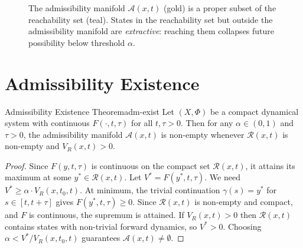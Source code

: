 \documentclass[12pt,twoside,openright]{book}
\newcommand{\reach}{\mathcal{R}}
\newcommand{\adm}{\mathcal{A}}
\begin{document}
\begin{figure}[h]
\centering
{}
\caption{The admissibility manifold $\adm(x,t)$ (gold) is a
  proper subset of the reachability set (teal). States in
  the reachability set but outside the admissibility
  manifold are \emph{extractive}: reaching them collapses
  future possibility below threshold $\alpha$.}
\label{fig:adm-manifold}
\end{figure}

\section{Admissibility Existence}
\label{sec:ch14-existence}

\begin{theorem}{Admissibility Existence Theorem}{adm-exist}
  Let $(X,\Phi)$ be a compact dynamical system with
  continuous $F(\cdot,t,\tau)$ for all $t,\tau>0$. Then for
  any $\alpha\in(0,1)$ and $\tau>0$, the admissibility
  manifold $\adm(x,t)$ is non-empty whenever $\reach(x,t)$
  is non-empty and $V_R(x,t)>0$.
\end{theorem}

\begin{proof}
  Since $F(y,t,\tau)$ is continuous on the compact set
  $\reach(x,t)$, it attains its maximum at some
  $y^*\in\reach(x,t)$. Let $V^* = F(y^*,t,\tau)$. We need
  $V^* \ge \alpha\cdot V_R(x,t_0,t)$. At minimum, the
  trivial continuation $\gamma(s)=y^*$ for
  $s\in[t,t+\tau]$ gives $F(y^*,t,\tau)\ge0$. Since
  $\reach(x,t)$ is non-empty and compact, and $F$ is
  continuous, the supremum is attained. If $V_R(x,t)>0$
  then $\reach(x,t)$ contains states with non-trivial
  forward dynamics, so $V^*>0$. Choosing
  $\alpha < V^*/V_R(x,t_0,t)$ guarantees
  $\adm(x,t)\ne\emptyset$.
\end{proof}
\end{document}
